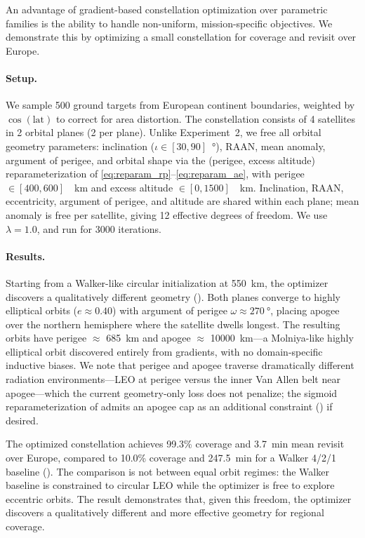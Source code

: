 An advantage of gradient-based constellation optimization over parametric families is the ability to handle non-uniform, mission-specific objectives.
We demonstrate this by optimizing a small constellation for coverage and revisit over Europe.

\paragraph{Setup.}
We sample 500 ground targets from European continent boundaries, weighted by $\cos(\text{lat})$ to correct for area distortion.
The constellation consists of 4 satellites in 2 orbital planes (2 per plane).
Unlike Experiment~2, we free all orbital geometry parameters: inclination ($\iota \in [30, 90]$\SI{}{\degree}), RAAN, mean anomaly, argument of perigee, and orbital shape via the (perigee, excess altitude) reparameterization of \eqref{eq:reparam_rp}--\eqref{eq:reparam_ae}, with perigee $\in [400, 600]$~\SI{}{\kilo\metre} and excess altitude $\in [0, 1500]$~\SI{}{\kilo\metre}.
Inclination, RAAN, eccentricity, argument of perigee, and altitude are shared within each plane; mean anomaly is free per satellite, giving 12 effective degrees of freedom.
We use $\lambda = 1.0$, and run for 3000 iterations.

\paragraph{Results.}
Starting from a Walker-like circular initialization at \SI{550}{\kilo\metre}, the optimizer discovers a qualitatively different geometry ().
Both planes converge to highly elliptical orbits ($e \approx 0.40$) with argument of perigee $\omega \approx \SI{270}{\degree}$, placing apogee over the northern hemisphere where the satellite dwells longest.
The resulting orbits have perigee $\approx$ \SI{685}{\kilo\metre} and apogee $\approx$ \SI{10000}{\kilo\metre}---a Molniya-like highly elliptical orbit discovered entirely from gradients, with no domain-specific inductive biases.
We note that perigee and apogee traverse dramatically different radiation environments---LEO at perigee versus the inner Van Allen belt near apogee---which the current geometry-only loss does not penalize; the sigmoid reparameterization of  admits an apogee cap as an additional constraint () if desired.

The optimized constellation achieves 99.3\% coverage and 3.7~min mean revisit over Europe, compared to 10.0\% coverage and 247.5~min for a Walker 4/2/1 baseline ().
The comparison is not between equal orbit regimes: the Walker baseline is constrained to circular LEO while the optimizer is free to explore eccentric orbits. The result demonstrates that, given this freedom, the optimizer discovers a qualitatively different and more effective geometry for regional coverage.

